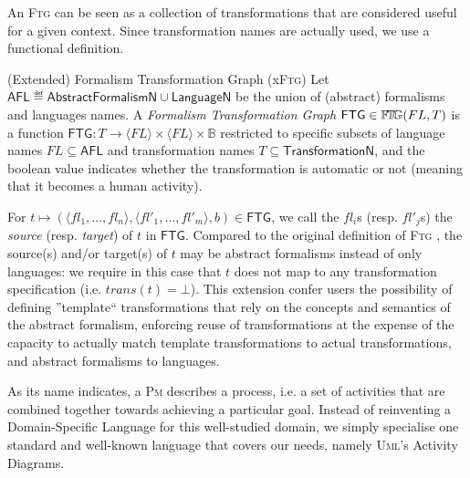 An \textsc{Ftg} can be seen as a collection of transformations that are 
considered useful for a given context. Since transformation names are actually 
used, we use a functional definition.

\begin{Definition}{(Extended) Formalism Transformation Graph (x\textsc{Ftg})}
Let $\mathsf{AFL} \eqdef \mathsf{AbstractFormalismN} \cup 
\mathsf{LanguageN}$ be the union of (abstract) formalisms and languages names. A 
\emph{Formalism Transformation Graph} $\mathsf{FTG} \in \mathbb{F}\!\mathbb{T}\!\mathbb{G}(FL, T)$ is a 
function  $\mathsf{FTG} \colon T \to \langle FL \rangle \times \langle FL 
\rangle \times \mathbb{B}$ restricted to specific subsets of language names $FL 
\subseteq \mathsf{AFL}$ and transformation names $T\subseteq 
\mathsf{TransformationN}$, and the boolean value indicates whether the 
transformation is automatic or not (meaning that it becomes a human activity).
%
\end{Definition}

\noindent
For $t \mapsto (\langle fl_1, \ldots, fl_n \rangle, \langle fl'_1, \ldots, 
fl'_m \rangle, b)\in \mathsf{FTG}$, we call the $fl_i$s (resp. $fl'_j$s) the 
\emph{source} (resp. \emph{target}) of $t$ in $\mathsf{FTG}$. 
Compared to the original definition of \textsc{Ftg} 
\cite{Mustafiz-etAl:2012,TR:Lucio-Mustafiz-etAl:2012}, the source(s) and/or 
target(s) of $t$ may be abstract formalisms instead of only languages: we 
require in this case that $t$ does not map to any transformation specification 
(i.e. $trans(t) = \bot$). This extension confer users the possibility of 
defining ''template`` transformations that rely on the concepts and semantics 
of the abstract formalism, enforcing reuse of transformations at the expense of 
the capacity to actually match template transformations to actual 
transformations, and abstract formalisms to languages. 


\medskip
As its name indicates, a \textsc{Pm} describes a process, i.e. a set of 
activities that are combined together towards achieving a particular goal. 
Instead of reinventing a Domain-Specific Language for this well-studied domain, 
we simply specialise one standard and well-known language that covers our 
needs, namely \textsc{Uml}'s Activity Diagrams.


